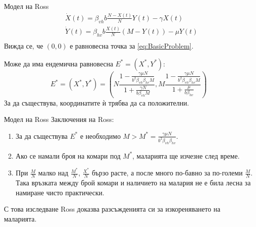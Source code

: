 \begin{frame}[t]{Модел на Ross}
  \begin{equation}
    \label{eq:BasicProblem}
    \begin{split}
      &\dot{X}(t) = \beta_{vh} b \frac{N-X(t)}{N} Y(t) - \gamma X(t) \\
      &\dot{Y}(t) = \beta_{hv} b \frac{X(t)}{N} (M-Y(t)) - \mu Y(t) \\
    \end{split}
  \end{equation}
  Вижда се, че $(0, 0)$ е равновесна точка за \ref{eq:BasicProblem}.

  Може да има ендемична равновесна $E^* = (X^*, Y^*)$:
  \begin{equation*}
    E^* = (X^*, Y^*) = \left(N \frac{1 - \frac{\gamma \mu N}{b^2 \beta_{vh} \beta_{hv} M}}{1 + \frac{\gamma N}{b \beta_{vh} M}}, M \frac{1 - \frac{\gamma \mu N}{b^2 \beta_{vh} \beta_{hv} M}}{1 + \frac{\mu}{b \beta_{hv}}}\right)
  \end{equation*}
  За да съществува, координатите ѝ трябва да са положителни.
\end{frame}

\begin{frame}[t]{Модел на Ross}
  Заключения на Ross:
  \begin{enumerate}
    \item За да съществува $E^*$ е необходимо $M > M^* = \frac{\gamma \mu N}{b^2 \beta_{vh} \beta_{hv}}$.
    \item Ако се намали броя на комари под $M^*$, маларията ще изчезне след време.
    \item При $\frac{M}{N}$ малко над $\frac{M^*}{N}$, $\frac{X^*}{N}$ бързо расте, а после много по-бавно за по-големи $\frac{M}{N}$. Така връзката между брой комари и наличието на малария не е била лесна за намиране чисто практически.
  \end{enumerate}

  С това изследване Ross доказва разсъжденията си за изкореняването на маларията.
\end{frame}
